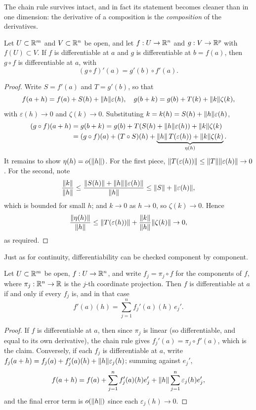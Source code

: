 \documentclass[a4paper]{scrartcl}
\begin{document}
The chain rule survives intact, and in fact its statement becomes cleaner than in one dimension: the derivative of a composition is the \emph{composition} of the derivatives.

\begin{theorem}
    Let $U \subset \mathbb{R}^m$ and $V \subset \mathbb{R}^n$ be open, and let $f: U \rightarrow \mathbb{R}^n$ and $g: V \rightarrow \mathbb{R}^p$ with $f(U) \subset V$. If $f$ is differentiable at $a$ and $g$ is differentiable at $b = f(a)$, then $g \circ f$ is differentiable at $a$, with
    $$
    (g \circ f)'(a) = g'(b) \circ f'(a).
    $$
\end{theorem}
\begin{proof}
    Write $S = f'(a)$ and $T = g'(b)$, so that
    $$
    f(a + h) = f(a) + S(h) + \norm{h}\varepsilon(h), \quad g(b + k) = g(b) + T(k) + \norm{k}\zeta(k),
    $$
    with $\varepsilon(h) \rightarrow 0$ and $\zeta(k) \rightarrow 0$. Substituting $k = k(h) = S(h) + \norm{h}\varepsilon(h)$,
    \begin{align*}
        (g \circ f)(a + h) &= g(b + k) = g(b) + T(S(h) + \norm{h}\varepsilon(h)) + \norm{k}\zeta(k) \\
        &= (g \circ f)(a) + (T \circ S)(h) + \underbrace{\norm{h}\, T(\varepsilon(h)) + \norm{k} \zeta(k)}_{\eta(h)}.
    \end{align*}
    It remains to show $\eta(h) = o(\norm{h})$. For the first piece, $\norm{T(\varepsilon(h))} \leq \norm{T}\norm{\varepsilon(h)} \rightarrow 0$. For the second, note
    $$
    \frac{\norm{k}}{\norm{h}} \leq \frac{\norm{S(h)} + \norm{h}\norm{\varepsilon(h)}}{\norm{h}} \leq \norm{S} + \norm{\varepsilon(h)},
    $$
    which is bounded for small $h$; and $k \rightarrow 0$ as $h \rightarrow 0$, so $\zeta(k) \rightarrow 0$. Hence
    $$
    \frac{\norm{\eta(h)}}{\norm{h}} \leq \norm{T(\varepsilon(h))} + \frac{\norm{k}}{\norm{h}}\norm{\zeta(k)} \rightarrow 0,
    $$
    as required.
\end{proof}

Just as for continuity, differentiability can be checked component by component.

\begin{proposition}[Components]\label{prop:components}
    Let $U \subset \mathbb{R}^m$ be open, $f: U \rightarrow \mathbb{R}^n$, and write $f_j = \pi_j \circ f$ for the components of $f$, where $\pi_j: \mathbb{R}^n \rightarrow \mathbb{R}$ is the $j$-th coordinate projection. Then $f$ is differentiable at $a$ if and only if every $f_j$ is, and in that case
    $$
    f'(a)(h) = \sum_{j = 1}^n f_j'(a)(h) \, e_j'.
    $$
\end{proposition}
\begin{proof}
    If $f$ is differentiable at $a$, then since $\pi_j$ is linear (so differentiable, and equal to its own derivative), the chain rule gives $f_j'(a) = \pi_j \circ f'(a)$, which is the claim. Conversely, if each $f_j$ is differentiable at $a$, write $f_j(a + h) = f_j(a) + f_j'(a)(h) + \norm{h}\varepsilon_j(h)$; summing against $e_j'$,
    $$
    f(a + h) = f(a) + \sum_{j = 1}^n f_j'(a)(h)e_j' + \norm{h}\sum_{j = 1}^n \varepsilon_j(h) e_j',
    $$
    and the final error term is $o(\norm{h})$ since each $\varepsilon_j(h) \rightarrow 0$.
\end{proof}
\end{document}
